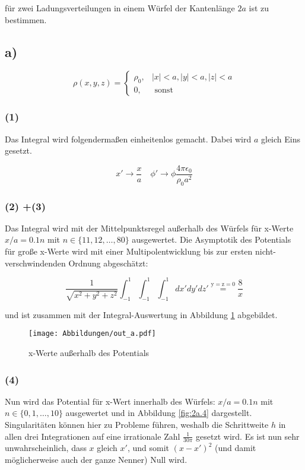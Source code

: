 \noindent
für zwei Ladungsverteilungen in einem Würfel der Kantenlänge $2a$ ist zu bestimmen.


\subsection*{a)}

\begin{equation*}
  \rho(x, y, z)=\left\{\begin{array}{ll}\rho_{0}, & |x|<a,|y|<a,|z|<a \\ 0, & \text { sonst }\end{array}\right.
\end{equation*}


\subsubsection*{(1)}

Das Integral wird folgendermaßen einheitenlos gemacht. Dabei wird $a$ gleich Eins
gesetzt.

\begin{equation*}
  x' \rightarrow \frac{x}{a} \quad
  \phi' \rightarrow \phi\frac{4\pi\epsilon_0}{\rho_0 a^2  }
\end{equation*}

\subsubsection*{(2) +(3)}
Das Integral wird mit der Mittelpunktsregel außerhalb des Würfels für x-Werte
$x / a=0.1 n$ mit $n \in\{11,12, \ldots, 80\}$ ausgewertet. Die Asymptotik des
Potentials für große x-Werte wird mit einer Multipolentwicklung bis zur ersten
nicht-verschwindenden Ordnung abgeschätzt:

\begin{equation*}
  \frac{1}{\sqrt{x^2+y^2+z^2}} \int_{-1}^1 \int_{-1}^1 \int_{-1}^1 dx'dy'dz'
  \overset{\mathrm{y=z=0}}{=} \frac{8}{x}
\end{equation*}

und ist zusammen mit der Integral-Auswertung in Abbildung \ref{fig:2a.2} abgebildet.

\begin{figure}[H]
    \centering
    \texttt{[image: Abbildungen/out\_a.pdf]}
    \caption{x-Werte außerhalb des Potentials}
    \label{fig:2a.2}
\end{figure}

\subsubsection*{(4)}
Nun wird das Potential für x-Wert innerhalb des Würfels:
$x / a=0.1 n$ mit $n \in\{0,1, \ldots, 10\}$ ausgewertet und in Abbildung \ref{fig:2a.4}
dargestellt. Singularitäten können hier zu Probleme führen, weshalb die Schrittweite $h$
in allen drei Integrationen auf eine irrationale Zahl $\frac{1}{30\pi}$ gesetzt wird.
Es ist nun sehr unwahrscheinlich, dass $x$ gleich $x'$, und somit $(x-x')^2$
(und damit möglicherweise auch der ganze Nenner) Null wird.

